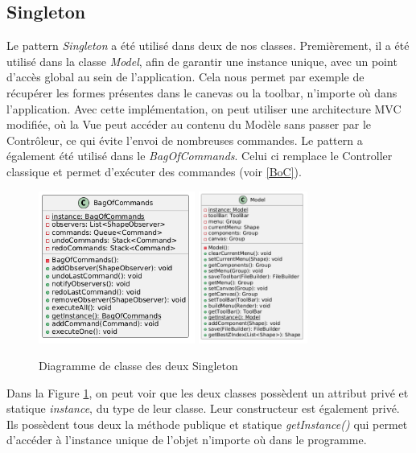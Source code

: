 \documentclass{article}
\begin{document}
\subsection{Singleton}

Le pattern \textit{Singleton} a été utilisé dans deux de nos classes. Premièrement, il a été utilisé dans la classe \textit{Model}, 
afin de garantir une instance unique, avec un point d'accès global au sein de l'application.
Cela nous permet par exemple de récupérer les formes présentes dans le canevas ou la toolbar, n'importe où dans l'application. Avec cette implémentation,
on peut utiliser une architecture MVC modifiée, où la Vue peut accéder au contenu du Modèle sans passer par le Contrôleur, ce qui évite l'envoi
de nombreuses commandes.
Le pattern a également été utilisé dans le \textit{BagOfCommands}. Celui ci remplace le Controller classique et permet d'exécuter des commandes (voir \ref{BoC}).

\begin{figure}[h]
    \centering
    \includegraphics[width=\textwidth,height=5.0cm,keepaspectratio]{singleton.png}
    \includegraphics[width=\textwidth,height=5.0cm,keepaspectratio]{singleton2.png}
    \caption{Diagramme de classe des deux Singleton}
    \label{Singleton}
\end{figure}
\FloatBarrier

Dans la Figure \ref{Singleton}, on peut voir que les deux classes possèdent un attribut privé et statique \textit{instance}, du type de leur classe.
Leur constructeur est également privé. Ils possèdent tous deux la méthode publique et statique \textit{getInstance()} qui permet
d'accéder à l'instance unique de l'objet n'importe où dans le programme.
\end{document}
